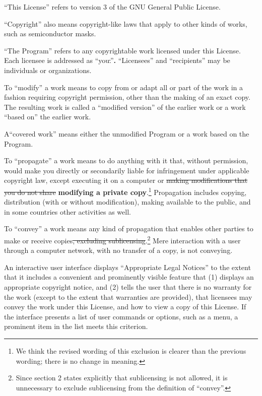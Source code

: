 \documentclass[11pt]{article}
\newcounter{v2section}
\newcounter{v3section}
\begin{document}

 ``This License'' refers to version 3 of the GNU General Public License.

  ``Copyright'' also means copyright-like laws that apply to other kinds
of works, such as semiconductor masks.

  ``The Program'' refers to any copyrightable work licensed under this
License.  Each licensee is addressed as ``you\sout{.}''\textbf{.}
``Licensees'' and ``recipients'' may be individuals or organizations.

  To ``modify'' a work means to copy from or adapt all or part of the
work in a fashion requiring copyright permission, other than the making
of an exact copy.  The resulting work is called a ``modified version''
of the earlier work or a work ``based on'' the earlier work. 

  A``covered work'' means either the unmodified Program or a work based
on the Program.

  To ``propagate'' a work means to do anything with it that, without
permission, would make you directly or secondarily liable for
infringement under applicable copyright law, except executing it on a
computer or \sout{making modifications that you do not share}
\textbf{modifying a private copy}.\footnote{We think the revised wording
of this exclusion is clearer than the previous wording; there is no
change in meaning.}  Propagation includes copying, distribution (with or
without modification), making available to the public, and in some
countries other activities as well.

  To ``convey'' a work means any kind of propagation that enables other
parties to make or receive copies\sout{, excluding
sublicensing}.\footnote{Since section 2 states explicitly that
sublicensing is not allowed, it is unnecessary to exclude sublicensing
from the definition of ``convey''.} Mere interaction with a user through
a computer network, with no transfer of a copy, is not conveying.

  An interactive user interface displays ``Appropriate Legal Notices''
to the extent that it includes a convenient and prominently visible
feature that (1) displays an appropriate copyright notice, and (2) tells
the user that there is no warranty for the work (except to the extent
that warranties are provided), that licensees may convey the work under
this License, and how to view a copy of this License.  If the interface
presents a list of user commands or options, such as a menu, a prominent
item in the list meets this criterion.
\end{document}
